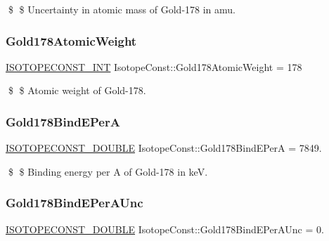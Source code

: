 \$ \$ Uncertainty in atomic mass of Gold-\/178 in amu. \mbox{\label{group___isotope_const-_gold-_au178_ga3683cf8598a77df47cc90702f637760e}} 
\subsubsection{\texorpdfstring{Gold178\+Atomic\+Weight}{Gold178AtomicWeight}}
{\footnotesize\ttfamily \mbox{\hyperlink{group___isotope_const-_macros_ga5f18360b3e99483a35c32d789e62621c}{I\+S\+O\+T\+O\+P\+E\+C\+O\+N\+S\+T\+\_\+\+I\+NT}} Isotope\+Const\+::\+Gold178\+Atomic\+Weight = 178}

\$ \$ Atomic weight of Gold-\/178. \mbox{\label{group___isotope_const-_gold-_au178_gaea70c076c1282c2016b1c07f63cc0894}} 
\subsubsection{\texorpdfstring{Gold178\+Bind\+E\+PerA}{Gold178BindEPerA}}
{\footnotesize\ttfamily \mbox{\hyperlink{group___isotope_const-_macros_ga8f45a7272ce02c0b4c65c44636ed719a}{I\+S\+O\+T\+O\+P\+E\+C\+O\+N\+S\+T\+\_\+\+D\+O\+U\+B\+LE}} Isotope\+Const\+::\+Gold178\+Bind\+E\+PerA = 7849.}

\$ \$ Binding energy per A of Gold-\/178 in keV. \mbox{\label{group___isotope_const-_gold-_au178_ga9dcd374cf7e4f6502c2995a07b0f7a66}} 
\subsubsection{\texorpdfstring{Gold178\+Bind\+E\+Per\+A\+Unc}{Gold178BindEPerAUnc}}
{\footnotesize\ttfamily \mbox{\hyperlink{group___isotope_const-_macros_ga8f45a7272ce02c0b4c65c44636ed719a}{I\+S\+O\+T\+O\+P\+E\+C\+O\+N\+S\+T\+\_\+\+D\+O\+U\+B\+LE}} Isotope\+Const\+::\+Gold178\+Bind\+E\+Per\+A\+Unc = 0.}

